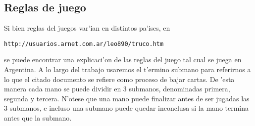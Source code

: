 \subsection{Reglas de juego}
Si bien reglas del juegos var'ian en distintos pa'ises, en 
\begin{verbatim}
http://usuarios.arnet.com.ar/leo890/truco.htm
\end{verbatim}
se puede encontrar una explicaci'on de las reglas del juego tal cual se juega en Argentina. A lo largo del trabajo usaremos el t'ermino submano para referirnos a lo que el citado documento se refiere como proceso de bajar cartas. De 'esta manera cada mano se puede dividir en 3 submanos, denominadas primera, segunda y tercera. N'otese que una mano puede finalizar antes de ser jugadas las 3 submanos, e incluso una submano puede quedar inconclusa si la mano termina antes que la submano.
